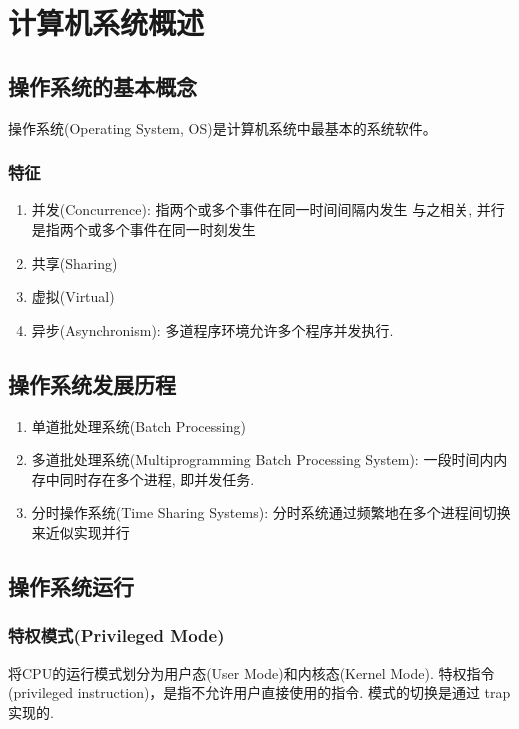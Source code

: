 \section{计算机系统概述}

\subsection{操作系统的基本概念}
操作系统(Operating System, OS)是计算机系统中最基本的系统软件。

\subsubsection{特征}
\begin{enumerate}
    \item 并发(Concurrence): 指两个或多个事件在同一时间间隔内发生
    \subitem 与之相关, 并行是指两个或多个事件在同一时刻发生
    \item 共享(Sharing)
    \item 虚拟(Virtual)
    \item 异步(Asynchronism): 多道程序环境允许多个程序并发执行. 
\end{enumerate}

\subsection{操作系统发展历程}
\begin{enumerate}
    \item 单道批处理系统(Batch Processing)
    \item 多道批处理系统(Multiprogramming Batch Processing System): 一段时间内内存中同时存在多个进程, 即并发任务. 
    \item 分时操作系统(Time Sharing Systems): 分时系统通过频繁地在多个进程间切换来近似实现并行
\end{enumerate}

\subsection{操作系统运行}

\subsubsection{特权模式(Privileged Mode)}
将CPU的运行模式划分为用户态(User Mode)和内核态(Kernel Mode). 特权指令(privileged instruction)，是指不允许用户直接使用的指令. 模式的切换是通过 trap 实现的. 


